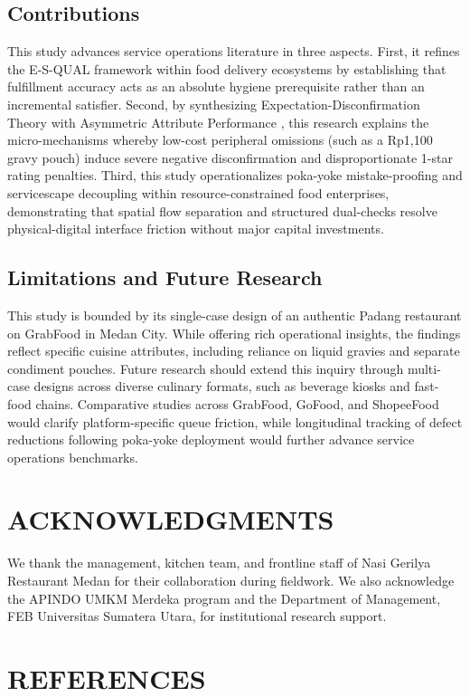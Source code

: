 \documentclass{jomas}
\begin{document}
\subsection{Contributions}
This study advances service operations literature in three aspects. First, it refines the E-S-QUAL framework \parencite{parasuraman2005esqual} within food delivery ecosystems by establishing that fulfillment accuracy acts as an absolute hygiene prerequisite rather than an incremental satisfier. Second, by synthesizing Expectation-Disconfirmation Theory \parencite{oliver1980cognition} with Asymmetric Attribute Performance \parencite{mittal1998asymmetric}, this research explains the micro-mechanisms whereby low-cost peripheral omissions (such as a Rp1,100 gravy pouch) induce severe negative disconfirmation and disproportionate 1-star rating penalties. Third, this study operationalizes poka-yoke mistake-proofing \parencite{chase1994failsafe} and servicescape decoupling \parencite{bitner1992servicescapes} within resource-constrained food enterprises, demonstrating that spatial flow separation and structured dual-checks resolve physical-digital interface friction without major capital investments.

\subsection{Limitations and Future Research}
This study is bounded by its single-case design of an authentic Padang restaurant on GrabFood in Medan City. While offering rich operational insights, the findings reflect specific cuisine attributes, including reliance on liquid gravies and separate condiment pouches. Future research should extend this inquiry through multi-case designs across diverse culinary formats, such as beverage kiosks and fast-food chains. Comparative studies across GrabFood, GoFood, and ShopeeFood would clarify platform-specific queue friction, while longitudinal tracking of defect reductions following poka-yoke deployment would further advance service operations benchmarks.

\section{ACKNOWLEDGMENTS}
We thank the management, kitchen team, and frontline staff of Nasi Gerilya Restaurant Medan for their collaboration during fieldwork. We also acknowledge the APINDO UMKM Merdeka program and the Department of Management, FEB Universitas Sumatera Utara, for institutional research support.

\newpage
\section{REFERENCES}
\begingroup
\renewcommand*{\bibfont}{\small}
\setlength{\bibitemsep}{1.5pt}
\setlength{\bibparsep}{0pt}
\printbibliography[heading=none]
\endgroup
\end{document}

